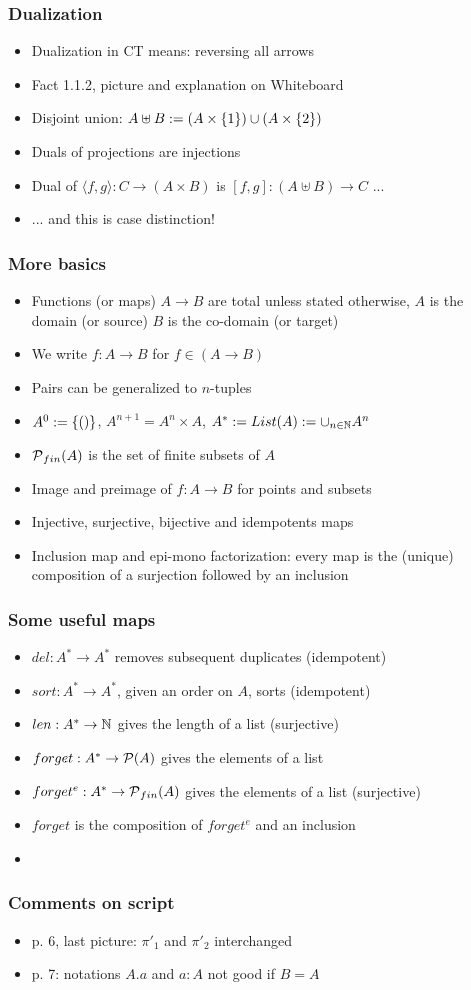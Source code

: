 \documentclass[handout]{beamer}
\begin{document}
\frame
  {   
    \frametitle{Dualization}\label{Ch1:sets}

 \begin{itemize}[<+->]
\item Dualization in CT means: reversing all arrows
\item Fact 1.1.2, picture and explanation on Whiteboard
\item Disjoint union: $A\uplus B := (A\times\{1\})\cup(A\times\{2\})$
\item Duals of projections are injections
\item Dual of $\langle f,g\rangle : C \to (A\times B)$ is $[ f,g] : (A\uplus B) \to C$ ...
\item ... and this is case distinction!
 \end{itemize}

 }


\frame
  {   
     \frametitle{More basics}\label{Ch1:setbasics}

 \begin{itemize}[<+->]
\item Functions (or maps) $A\to B$ are total unless stated otherwise, 
$A$ is the domain (or source) $B$ is the co-domain (or target)
\item We write $f: A\to B$ for $f\in (A\to B)$
\item Pairs can be generalized to $n$-tuples
\item $A^0 := \{()\}$, $A^{n+1}=A^n\times A$,
$A^* := List(A) := \cup_{n\in\mathbb{N}} A^n$
\item $\operatorname{\mathcal{P}}_{fin}(A)$ is the set of finite subsets of $A$
\item Image and preimage of $f: A\to B$ for points and subsets 
\item Injective, surjective, bijective and idempotents maps
\item Inclusion map and epi-mono factorization: every map
is the (unique) composition of a surjection followed by an inclusion
 \end{itemize}

 }

\frame
  {   
    \frametitle{Some useful maps}\label{Ch1:usefulmaps}

 \begin{itemize}[<+->]
\item $del: A^* \to A^* $ removes subsequent duplicates (idempotent)
\item $sort: A^* \to A^* $, given an order on $A$, sorts (idempotent)
\item $len: A^* \to \mathbb{N} $ gives the length of a list (surjective)
\item $forget: A^* \to \operatorname{\mathcal{P}}(A) $ gives the elements of a list
\item $forget^e: A^* \to \operatorname{\mathcal{P}}_{fin}(A) $ gives the elements of a list (surjective)
\item $forget$ is the composition of $forget^e$ and an inclusion
\item 
 \end{itemize}

 }

\frame
  {   
    \frametitle{Comments on script}\label{Ch1:comments}

 \begin{itemize}[<+->]
\item p. 6, last picture: $\pi'_1$ and  $\pi'_2$ interchanged
\item p. 7: notations $A.a$ and $a:A$ not good if $B=A$
 \end{itemize}

 }
\end{document}
